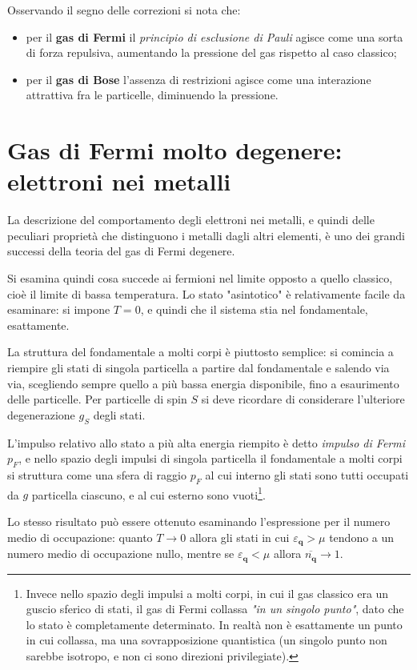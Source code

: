 Osservando il segno delle correzioni si nota che:
\begin{itemize}
	\item per il \textbf{gas di Fermi} il \textit{principio di esclusione di Pauli} agisce come una sorta di forza repulsiva, aumentando la pressione del gas rispetto al caso classico;
	\item per il \textbf{gas di Bose} l'assenza di restrizioni agisce come una interazione attrattiva fra le particelle, diminuendo la pressione.
\end{itemize}

\section{Gas di Fermi molto degenere: elettroni nei metalli}
La descrizione del comportamento degli elettroni nei metalli, e quindi delle peculiari proprietà che distinguono i metalli dagli altri elementi, è uno dei grandi successi della teoria del gas di Fermi degenere.
\newline

Si esamina quindi cosa succede ai fermioni nel limite opposto a quello classico, cioè il limite di bassa temperatura.
Lo stato "asintotico" è relativamente facile da esaminare: si impone $T=0$, e quindi che il sistema stia nel fondamentale, esattamente.

La struttura del fondamentale a molti corpi è piuttosto semplice: si comincia a riempire gli stati di singola particella a partire dal fondamentale e salendo via via, scegliendo sempre quello a più bassa energia disponibile, fino a esaurimento delle particelle. Per particelle di spin $S$ si deve ricordare di considerare l'ulteriore degenerazione $g_S$ degli stati.

L'impulso relativo allo stato a più alta energia riempito è detto \textit{impulso di Fermi} $p_F$, e nello spazio degli impulsi di singola particella il fondamentale a molti corpi si struttura come una sfera di raggio $p_F$ al cui interno gli stati sono tutti occupati da $g$ particella ciascuno, e al cui esterno sono vuoti\footnote{Invece nello spazio degli impulsi a molti corpi, in cui il gas classico era un guscio sferico di stati, il gas di Fermi collassa \textit{"in un singolo punto"}, dato che lo stato è completamente determinato. In realtà non è esattamente un punto in cui collassa, ma una sovrapposizione quantistica (un singolo punto non sarebbe isotropo, e non ci sono direzioni privilegiate).}.

Lo stesso risultato può essere ottenuto esaminando l'espressione per il numero medio di occupazione: quanto $T\rightarrow 0$ allora gli stati in cui $\varepsilon_{\textbf{q}} > \mu$ tendono a un numero medio di occupazione nullo, mentre se $\varepsilon_{\textbf{q}} < \mu$ allora $\overline{n_{\textbf{q}}} \rightarrow 1$.

